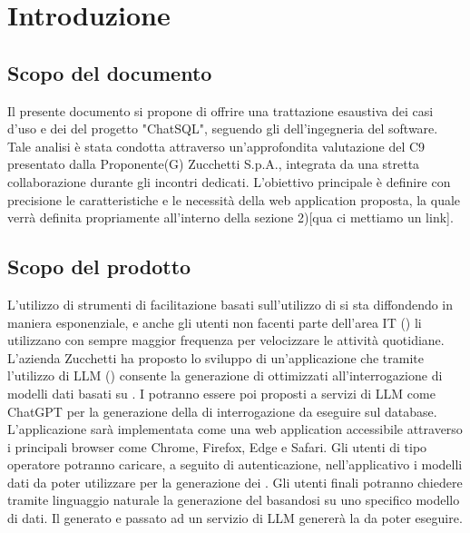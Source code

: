 \section{Introduzione}

\subsection{Scopo del documento}
Il presente documento si propone di offrire una trattazione esaustiva dei casi d'uso e dei  del progetto "ChatSQL", seguendo gli  dell'ingegneria del software. Tale analisi è stata condotta attraverso un'approfondita valutazione del  C9 presentato dalla Proponente(G) Zucchetti S.p.A., integrata da una stretta collaborazione durante gli incontri dedicati.
L'obiettivo principale è definire con precisione le caratteristiche e le necessità della web application proposta, la quale verrà definita propriamente all'interno della sezione 2)[qua ci mettiamo un link].

\subsection{Scopo del prodotto}
L’utilizzo di strumenti di facilitazione basati sull’utilizzo di  si sta diffondendo in maniera esponenziale, e anche gli utenti non facenti parte dell’area IT () li utilizzano con sempre maggior frequenza per velocizzare le attività quotidiane. L’azienda Zucchetti ha proposto lo sviluppo di un’applicazione che tramite l’utilizzo di LLM () consente la generazione di  ottimizzati all’interrogazione di modelli dati basati su . I  potranno essere poi proposti a servizi di LLM come ChatGPT per la generazione della  di interrogazione da eseguire sul database.
L'applicazione sarà implementata come una web application accessibile attraverso i principali browser come Chrome, Firefox, Edge e Safari. Gli utenti di tipo operatore potranno caricare, a seguito di autenticazione, nell’applicativo i modelli dati da poter utilizzare per la generazione dei . Gli utenti finali potranno chiedere tramite linguaggio naturale la generazione del  basandosi su uno specifico modello di dati. Il  generato e passato ad un servizio di LLM genererà la  da poter eseguire.

